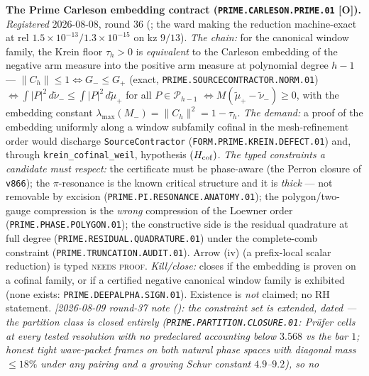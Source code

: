 \par\smallskip\noindent\textbf{The Prime Carleson embedding
contract (\texttt{PRIME.CARLESON.PRIME.01} [O]).}
{\sloppy
\emph{Registered} 2026-08-08, round 36
(; the ward making the
reduction machine-exact at rel
$1.5\times10^{-13}/1.3\times10^{-15}$ on kz $9/13$).
\emph{The chain:} for the canonical window family, the Krein
floor $\tau_h > 0$ is \emph{equivalent} to the Carleson
embedding of the negative arm measure into the positive arm
measure at polynomial degree $h - 1$ --- $\|C_h\| \le 1
\Leftrightarrow G_- \le G_+$ (exact,
\texttt{PRIME.SOURCECONTRACTOR.NORM.01}) $\Leftrightarrow
\int|P|^2\,d\tilde\nu_- \le \int|P|^2\,d\tilde\mu_+$ for all
$P \in \mathcal P_{h-1}$ $\Leftrightarrow M(\tilde\mu_+ -
\tilde\nu_-) \ge 0$, with the embedding constant
$\lambda_{\max}(M_-) = \|C_h\|^2 = 1 - \tau_h$.  \emph{The
demand:} a proof of the embedding uniformly along a window
subfamily cofinal in the mesh-refinement order would discharge
\texttt{SourceContractor}
(\texttt{FORM.PRIME.KREIN.DEFECT.01}) and, through
\texttt{krein\_cofinal\_weil}, hypothesis $(H_{\rm cof})$.
\emph{The typed constraints a candidate must respect:} the
certificate must be phase-aware (the Perron closure of
\texttt{v866}); the $\pi$-resonance is the known critical
structure and it is \emph{thick} --- not removable by excision
(\texttt{PRIME.PI.RESONANCE.ANATOMY.01}); the polygon/two-gauge
compression is the \emph{wrong} compression of the Loewner
order (\texttt{PRIME.PHASE.POLYGON.01}); the constructive side
is the residual quadrature at full degree
(\texttt{PRIME.RESIDUAL.QUADRATURE.01}) under the complete-comb
constraint (\texttt{PRIME.TRUNCATION.AUDIT.01}).  Arrow (iv)
(a prefix-local scalar reduction) is typed \textsc{needs
proof}.  \emph{Kill/close:} closes if the embedding is proven
on a cofinal family, or if a certified negative canonical
window family is exhibited (none exists:
\texttt{PRIME.DEEPALPHA.SIGN.01}).  Existence is \emph{not}
claimed; no RH statement.
\emph{[2026-08-09 round-37 note
(): the constraint
set is extended, dated --- the partition class is closed
\emph{entirely} (\texttt{PRIME.PARTITION.CLOSURE.01}: Pr\"ufer
cells at every tested resolution with no predeclared accounting
below $3.568$ vs the bar $1$; honest tight wave-packet frames on
both natural phase spaces with diagonal mass $\le 18\%$ under any
pairing and a growing Schur constant $4.9$--$9.2$), so no
}}
